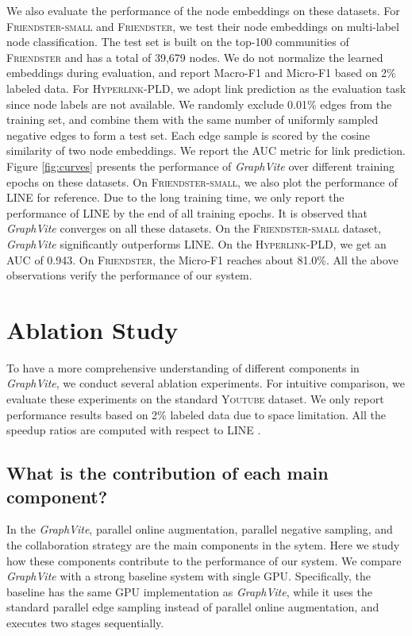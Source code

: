 \documentclass[sigconf]{acmart}
\newcommand{\dataset}[1]{\textsc{#1}\xspace}
\newcommand{\Graphy}{\textit{GraphVite}\xspace}
\begin{document}
We also evaluate the performance of the node embeddings on these datasets. For \dataset{Friendster-small} and \dataset{Friendster}, we test their node embeddings on multi-label node classification. The test set is built on the top-100 communities of \dataset{Friendster} and has a total of 39,679 nodes. We do not normalize the learned embeddings during evaluation, and report Macro-F1 and Micro-F1 based on 2\% labeled data. For \dataset{Hyperlink-PLD}, we adopt link prediction as the evaluation task since node labels are not available. We randomly exclude 0.01\% edges from the training set, and combine them with the same number of uniformly sampled negative edges to form a test set. Each edge sample is scored by the cosine similarity of two node embeddings. We report the AUC metric for link prediction. Figure \ref{fig:curves} presents the performance of \Graphy over different training epochs on these datasets. On \dataset{Friendster-small}, we also plot the performance of LINE for reference. Due to the long training time, we only report the performance of LINE by the end of all training epochs. It is observed that \Graphy converges on all these datasets. On the \dataset{Friendster-small} dataset, \Graphy significantly outperforms LINE. On the \dataset{Hyperlink-PLD}, we get an AUC of 0.943. On \dataset{Friendster}, the Micro-F1 reaches about 81.0\%. All the above observations verify the performance of our system. \section{Ablation Study}
\label{sec:ablation}

To have a more comprehensive understanding of different components in \Graphy, we conduct several ablation experiments. For intuitive comparison, we evaluate these experiments on the standard \dataset{Youtube} dataset. We only report performance results based on 2\% labeled data due to space limitation. All the speedup ratios are computed with respect to LINE \cite{tang2015line}.

\subsection{What is the contribution of each main component?}

In the \Graphy, parallel online augmentation, parallel negative sampling, and the collaboration strategy are the main components in the sytem. Here we study how these components contribute to the performance of our system. We compare \Graphy with a strong baseline system with single GPU. Specifically, the baseline has the same GPU implementation as \Graphy, while it uses the standard parallel edge sampling instead of parallel online augmentation, and executes two stages sequentially.
\end{document}
